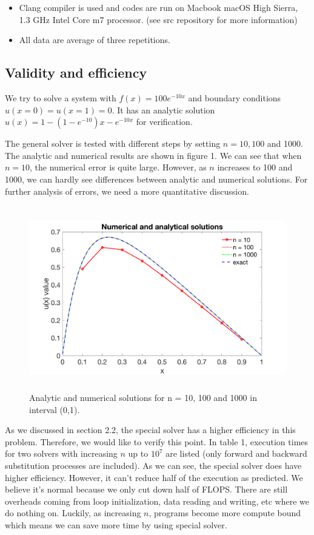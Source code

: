 \documentclass[12pt]{article}
\begin{document}
\begin{itemize}
\item Clang compiler is used and codes are run on Macbook macOS High Sierra, 1.3 GHz Intel Core m7 processor. (see src repository for more information)
\item All data are average of three repetitions.
\end{itemize}

\subsection{Validity and efficiency}

We try to solve a system with $f(x)=100e^{-10x}$ and boundary conditions $u(x=0)=u(x=1)=0$. It has an analytic solution $u(x)=1-(1-e^{-10})x-e^{-10x}$ for verification.

The general solver is tested with different steps by setting $n = 10, 100$ and 1000. The analytic and numerical results are shown in figure 1. We can see that when $n = 10$, the numerical error is quite large. However, as $n$ increases to 100 and 1000, we can hardly see differences between analytic and numerical solutions. For further analysis of errors, we need a more quantitative discussion.

\begin{figure}[h!]
\centering
\includegraphics[width=14cm,height=8cm]{c.png}
\caption{Analytic and numerical solutions for n = 10, 100 and 1000 in interval (0,1).}
\label{fig:1}
\end{figure}

As we discussed in section 2.2, the special solver has a higher efficiency in this problem. Therefore, we would like to verify this point. In table 1, execution times for two solvers with increasing $n$ up to $10^7$ are listed (only forward and backward substitution processes are included). As we can see, the special solver does have higher efficiency. However, it can't reduce half of the execution as predicted. We believe it's normal because we only cut down half of FLOPS. There are still overheads coming from loop initialization, data reading and writing, etc where we do nothing on. Luckily, as increasing $n$, programs become more compute bound which means we can save more time by using special solver.
\end{document}
